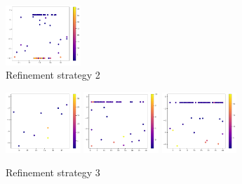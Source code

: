 \begin{figure}[H]
\begin{subfigure}{\textwidth}
		\includegraphics[width=0.31\textwidth]{figures/Adaptive_random/Machine_learning_first/Alternative_1_budget_100}
		\caption{ Refinement strategy 2 }
		\label{fig:alt1_ml}
	\end{subfigure}
	\begin{subfigure}{\textwidth}
		\centering
		\includegraphics[width=0.31\textwidth]{figures/Adaptive_random/Machine_learning_first/Alternative_2_budget_10}
		\includegraphics[width=0.31\textwidth]{figures/Adaptive_random/Machine_learning_first/Alternative_2_budget_50}
		\includegraphics[width=0.31\textwidth]{figures/Adaptive_random/Machine_learning_first/Alternative_2_budget_100}
		\caption{ Refinement strategy 3 }
		\label{fig:alt2_ml}
	\end{subfigure}
	
	\caption{  }
	\label{fig:Alternatives_ml_visualization}
\end{figure}


